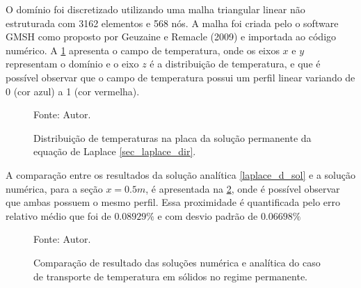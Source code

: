 O domínio foi discretizado utilizando uma malha triangular linear não estruturada com 3162 elementos e 568 nós.
A malha foi criada pelo o software GMSH como proposto por Geuzaine e Remacle (2009)\cite{gmsh} e importada ao código numérico.
A \ref{laplace_d_3d} apresenta o campo de temperatura, onde os eixos $x$ e $y$ representam o domínio e o eixo $z$ é a distribuição de temperatura, e que é possível observar que o campo de temperatura possui um perfil linear variando de 0 (cor azul) a 1 (cor vermelha).
\begin{figure}[H]
    \centering
     {\raggedleft \scriptsize Fonte: Autor.}
    \caption{Distribuição de temperaturas na placa da solução permanente da equação de Laplace \ref{sec_laplace_dir}.}
    \label{laplace_d_3d}
\end{figure}

A comparação entre os resultados da solução analítica \eqref{laplace_d_sol} e a solução numérica, para a seção $x=0.5m$, é apresentada na \ref{laplace_d_perm_comp}, onde é possível observar que ambas possuem o mesmo perfil.
Essa proximidade é quantificada pelo erro relativo médio que foi de $0.08929\%$ e com desvio padrão de $0.06698\%$
\begin{figure}[H]
    \centering
     {\raggedleft \scriptsize Fonte: Autor.}
    \caption{Comparação de resultado das soluções numérica e analítica do caso de transporte de temperatura em sólidos no regime permanente.}
    \label{laplace_d_perm_comp}
\end{figure}

